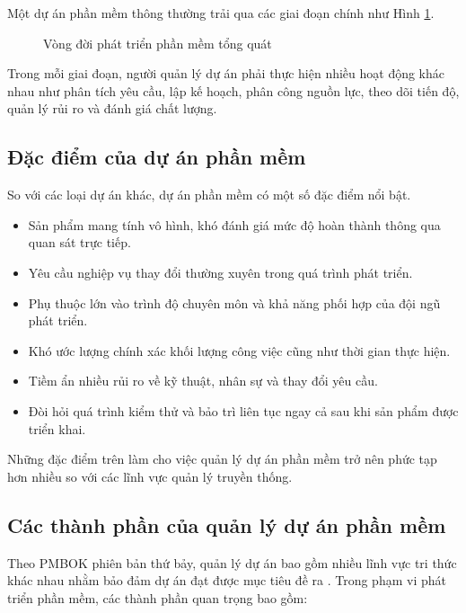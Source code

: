 \documentclass[12pt,a4paper]{report}
\begin{document}
Một dự án phần mềm thông thường trải qua các giai đoạn chính như Hình \ref{fig:software_lifecycle}.

\begin{figure}[H]
\centering
{}
\caption{Vòng đời phát triển phần mềm tổng quát}
\label{fig:software_lifecycle}
\end{figure}

Trong mỗi giai đoạn, người quản lý dự án phải thực hiện nhiều hoạt động khác nhau như phân tích yêu cầu, lập kế hoạch, phân công nguồn lực, theo dõi tiến độ, quản lý rủi ro và đánh giá chất lượng.

\subsection{Đặc điểm của dự án phần mềm}
So với các loại dự án khác, dự án phần mềm có một số đặc điểm nổi bật.

\begin{itemize}

\item
Sản phẩm mang tính vô hình, khó đánh giá mức độ hoàn thành thông qua quan sát trực tiếp.

\item
Yêu cầu nghiệp vụ thay đổi thường xuyên trong quá trình phát triển.

\item
Phụ thuộc lớn vào trình độ chuyên môn và khả năng phối hợp của đội ngũ phát triển.

\item
Khó ước lượng chính xác khối lượng công việc cũng như thời gian thực hiện.

\item
Tiềm ẩn nhiều rủi ro về kỹ thuật, nhân sự và thay đổi yêu cầu.

\item
Đòi hỏi quá trình kiểm thử và bảo trì liên tục ngay cả sau khi sản phẩm được triển khai.

\end{itemize}

Những đặc điểm trên làm cho việc quản lý dự án phần mềm trở nên phức tạp hơn nhiều so với các lĩnh vực quản lý truyền thống.

\subsection{Các thành phần của quản lý dự án phần mềm}
Theo PMBOK phiên bản thứ bảy, quản lý dự án bao gồm nhiều lĩnh vực tri thức khác nhau nhằm bảo đảm dự án đạt được mục tiêu đề ra \cite{pmbok7}. Trong phạm vi phát triển phần mềm, các thành phần quan trọng bao gồm:
\end{document}
